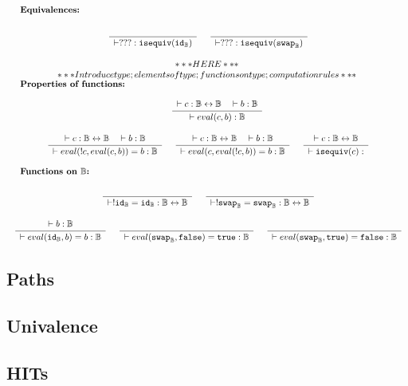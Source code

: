 \documentclass[format=acmlarge,review,natbib]{acmart}
\newcommand{\invc}[1]{!#1}
\newcommand{\evalone}[2]{eval(#1,#2)}
\newcommand{\isequiv}[1]{\mathtt{isequiv}(#1)}
\newcommand{\idc}{\mathtt{id}}
\newcommand{\swapc}{\mathtt{swap}}
\newcommand{\iso}{\leftrightarrow}
\newcommand{\fc}{\mathtt{false}}
\newcommand{\tc}{\mathtt{true}}
\newcommand{\boolt}{\mathbb{B}}
\newcommand{\Rule}[2]{
\makebox{
$\displaystyle
\frac{\begin{array}{l}#1\\\end{array}}
{\begin{array}{l}#2\\\end{array}}$}}
\newcommand{\proves}{\vdash}
\newcommand{\jdg}[3]{#1 \proves #2 : #3}
\begin{document}
\[\begin{array}{c}
\\
\\
\noalign{\textbf{Equivalences:}} \\
\Rule{}{\jdg{}{???}{\isequiv{\idc_{\boolt}}}}
\quad
\Rule{}{\jdg{}{???}{\isequiv{\swapc_{\boolt}}}}
\\
\\
***HERE*** \\
*** Introduce type; elements of type; functions on type; computation rules *** \\
\noalign{\textbf{Properties of functions:}} \\
\quad
\quad
\Rule{\jdg{}{c}{\boolt\iso\boolt}
         \quad\jdg{}{b}{\boolt}}
        {\jdg{}{\evalone{c}{b}}{\boolt}}
\\
\\
\Rule{\jdg{}{c}{\boolt\iso\boolt}
         \quad\jdg{}{b}{\boolt}}
        {\jdg{}{\evalone{\invc{c}}{\evalone{c}{b}} = b}{\boolt}}
\quad
\Rule{\jdg{}{c}{\boolt\iso\boolt}
         \quad\jdg{}{b}{\boolt}}
        {\jdg{}{\evalone{c}{\evalone{\invc{c}}{b}} = b}{\boolt}}
\quad
\Rule{\jdg{}{c}{\boolt\iso\boolt}}
        {\jdg{}{\isequiv{c}}{}}
\\
\\
\noalign{\textbf{Functions on $\boolt$:}} \\
\Rule{}{\jdg{}{\invc{\idc_{\boolt} = \idc_{\boolt}}}{\boolt\iso\boolt}}
\quad
\Rule{}{\jdg{}{\invc{\swapc _{\boolt}} = \swapc _{\boolt}}{\boolt\iso\boolt}}
\\
\\
\Rule{\jdg{}{b}{\boolt}}
        {\jdg{}{\evalone{\idc_{\boolt}}{b} = b}{\boolt}}
\quad
\Rule{}
        {\jdg{}{\evalone{\swapc_{\boolt}}{\fc} = \tc}{\boolt}}
\quad
\Rule{}
        {\jdg{}{\evalone{\swapc_{\boolt}}{\tc} = \fc}{\boolt}}
\end{array}\]

\subsection{Paths}

\subsection{Univalence}

\subsection{HITs}

\newpage
\end{document}
